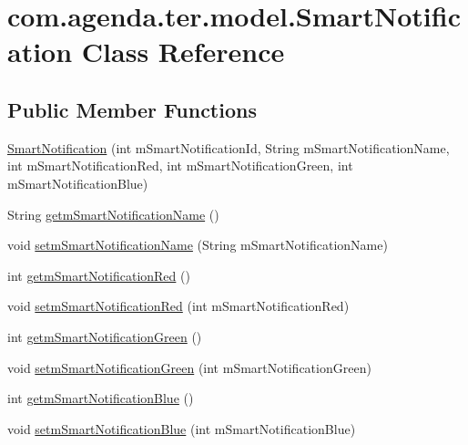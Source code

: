 \hypertarget{classcom_1_1agenda_1_1ter_1_1model_1_1_smart_notification}{\section{com.\-agenda.\-ter.\-model.\-Smart\-Notification Class Reference}
\label{classcom_1_1agenda_1_1ter_1_1model_1_1_smart_notification}
}
\subsection*{Public Member Functions}
\begin{DoxyCompactItemize}
\item 
\hyperlink{classcom_1_1agenda_1_1ter_1_1model_1_1_smart_notification_a5a77e7335be3b22c33a6d8455c3971e3}{Smart\-Notification} (int m\-Smart\-Notification\-Id, String m\-Smart\-Notification\-Name, int m\-Smart\-Notification\-Red, int m\-Smart\-Notification\-Green, int m\-Smart\-Notification\-Blue)
\item 
String \hyperlink{classcom_1_1agenda_1_1ter_1_1model_1_1_smart_notification_af9b3a3d85bd158662da02cda0b9070ed}{getm\-Smart\-Notification\-Name} ()
\item 
void \hyperlink{classcom_1_1agenda_1_1ter_1_1model_1_1_smart_notification_a5b0af993a186f5f5fd51bf1c9d41baf5}{setm\-Smart\-Notification\-Name} (String m\-Smart\-Notification\-Name)
\item 
int \hyperlink{classcom_1_1agenda_1_1ter_1_1model_1_1_smart_notification_ab3b94117d8a5ccb966ded69d1c356cd7}{getm\-Smart\-Notification\-Red} ()
\item 
void \hyperlink{classcom_1_1agenda_1_1ter_1_1model_1_1_smart_notification_a604f3ee90ead2bd5edf0f034d673a4da}{setm\-Smart\-Notification\-Red} (int m\-Smart\-Notification\-Red)
\item 
int \hyperlink{classcom_1_1agenda_1_1ter_1_1model_1_1_smart_notification_a2e4a592207e68cc6f816483a292f9898}{getm\-Smart\-Notification\-Green} ()
\item 
void \hyperlink{classcom_1_1agenda_1_1ter_1_1model_1_1_smart_notification_a30b8d58cb2ae5f130e3c4a4ecbc16cef}{setm\-Smart\-Notification\-Green} (int m\-Smart\-Notification\-Green)
\item 
int \hyperlink{classcom_1_1agenda_1_1ter_1_1model_1_1_smart_notification_a873c1a7e37b3207916ef1e92ff07198e}{getm\-Smart\-Notification\-Blue} ()
\item 
void \hyperlink{classcom_1_1agenda_1_1ter_1_1model_1_1_smart_notification_a12ad84eb48b091ecad9f58ef1b50ea06}{setm\-Smart\-Notification\-Blue} (int m\-Smart\-Notification\-Blue)

\end{DoxyCompactItemize}
